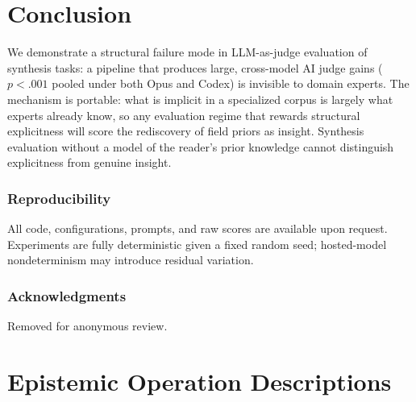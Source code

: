 \documentclass{article}
\begin{document}
\section{Conclusion}

We demonstrate a structural failure mode in LLM-as-judge evaluation of synthesis tasks: a pipeline that produces large, cross-model AI judge gains ($p{<}.001$ pooled under both Opus and Codex) is invisible to domain experts. The mechanism is portable: what is implicit in a specialized corpus is largely what experts already know, so any evaluation regime that rewards structural explicitness will score the rediscovery of field priors as insight. Synthesis evaluation without a model of the reader's prior knowledge cannot distinguish explicitness from genuine insight.

\subsubsection*{Reproducibility}

All code, configurations, prompts, and raw scores are available upon request. Experiments are fully deterministic given a fixed random seed; hosted-model nondeterminism may introduce residual variation.

\subsubsection*{Acknowledgments}
Removed for anonymous review.




\appendix

\section{Epistemic Operation Descriptions}
\label{app:operations}
\end{document}
